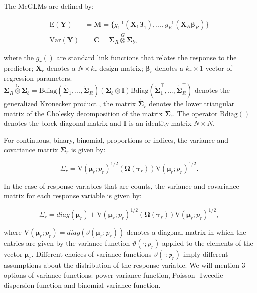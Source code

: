 \documentclass[Review,sagev,times, doublespace]{sagej}
\begin{document}
The McGLMs \citep{Bonat16} are defined by:

$$
      \begin{aligned}
        \mathrm{E}(\boldsymbol{Y}) &=
          \boldsymbol{M} =
            \{g_1^{-1}(\boldsymbol{X}_1 \boldsymbol{\beta}_1),
            \ldots,
            g_R^{-1}(\boldsymbol{X}_R \boldsymbol{\beta}_R)\}
          \\
        \mathrm{Var}(\boldsymbol{Y}) &=
          \boldsymbol{C} =
            \boldsymbol{\Sigma}_R \overset{G} \otimes
            \boldsymbol{\Sigma}_b,
      \end{aligned}
$$

\noindent where the $g_r()$ are standard link functions that relates the response to the predictor; $\boldsymbol{X}_r$ denotes a $N \times k_r$ design matrix; $\boldsymbol{\beta}_r$ denotes a  $k_r \times 1$ vector of regression parameters. $\boldsymbol{\Sigma}_R \overset{G} \otimes \boldsymbol{\Sigma}_b = \mathrm{Bdiag}(\tilde{\boldsymbol{\Sigma}}_1, \ldots, \tilde{\boldsymbol{ \Sigma}}_R) (\boldsymbol{\Sigma}_b \otimes \boldsymbol{I}) \mathrm{Bdiag}(\tilde{\boldsymbol{\Sigma}}_1^\top, \ldots, \tilde{\boldsymbol{\Sigma}}_R^\top)$ denotes the generalized Kronecker product \cite{martinez13}, the matrix $\tilde{\boldsymbol{\Sigma}}_r$ denotes the lower triangular matrix of the Cholesky decomposition of the matrix ${\boldsymbol{\Sigma}}_r$. The operator $\mathrm{Bdiag()}$ denotes the block-diagonal matrix and $\boldsymbol{I}$ is an identity matrix $N \times N$.

For continuous, binary, binomial, proportions or indices, the variance and covariance matrix $\boldsymbol{\Sigma}_r$ is given by:

$$
\Sigma_r =
\mathrm{V}\left(\boldsymbol{\mu}_r; p_r\right)^{1/2}(\boldsymbol{\Omega}\left(\boldsymbol{\tau}_r\right))\mathrm{V}\left(\boldsymbol{\mu}_r; p_r\right)^{1/2}.
$$

In the case of response variables that are counts, the variance and covariance matrix for each response variable is given by:

$$
\Sigma_r = diag(\boldsymbol{\mu}_r)+ \mathrm{V}\left(\boldsymbol{\mu}_r; p_r\right)^{1/2}(\boldsymbol{\Omega}\left(\boldsymbol{\tau}_r\right))\mathrm{V}\left(\boldsymbol{\mu}_r; p_r\right)^{1/2},
$$

\noindent where $\mathrm{V}\left(\boldsymbol{\mu}_r; p_r\right) = diag(\vartheta(\boldsymbol{\mu}_r; p_r))$ denotes a diagonal matrix in which the entries are given by the variance function $\vartheta(\cdot; p_r)$ applied to the elements of the vector $\boldsymbol{\mu}_r$. Different choices of variance functions $\vartheta(\cdot; p_r)$ imply different assumptions about the distribution of the response variable. We will mention 3 options of variance functions: power variance function, Poisson–Tweedie dispersion function and binomial variance function.
\end{document}
